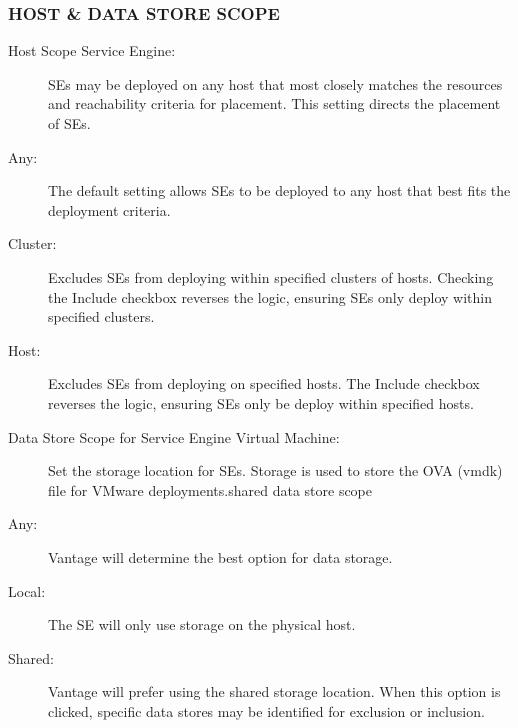 \documentclass[letterpaper,10pt,english]{sphinxmanual}
\begin{document}
\subsubsection{HOST \& DATA STORE SCOPE}
\label{\detokenize{getting_started/service_engine_group:host-data-store-scope}}\begin{description}
\item[{Host Scope Service Engine:}] \leavevmode
SEs may be deployed on any host that most closely matches the resources and reachability criteria for placement. This setting directs the placement of SEs.

\item[{Any:}] \leavevmode
The default setting allows SEs to be deployed to any host that best fits the deployment criteria.

\item[{Cluster:}] \leavevmode
Excludes SEs from deploying within specified clusters of hosts. Checking the Include checkbox reverses the logic, ensuring SEs only deploy within specified clusters.

\item[{Host:}] \leavevmode
Excludes SEs from deploying on specified hosts. The Include checkbox reverses the logic, ensuring SEs only be deploy within specified hosts.

\item[{Data Store Scope for Service Engine Virtual Machine:}] \leavevmode
Set the storage location for SEs. Storage is used to store the OVA (vmdk) file for VMware deployments.shared data store scope

\item[{Any:}] \leavevmode
Vantage will determine the best option for data storage.

\item[{Local:}] \leavevmode
The SE will only use storage on the physical host.

\item[{Shared:}] \leavevmode
Vantage will prefer using the shared storage location. When this option is clicked, specific data stores may be identified for exclusion or inclusion.

\end{description}
\end{document}

